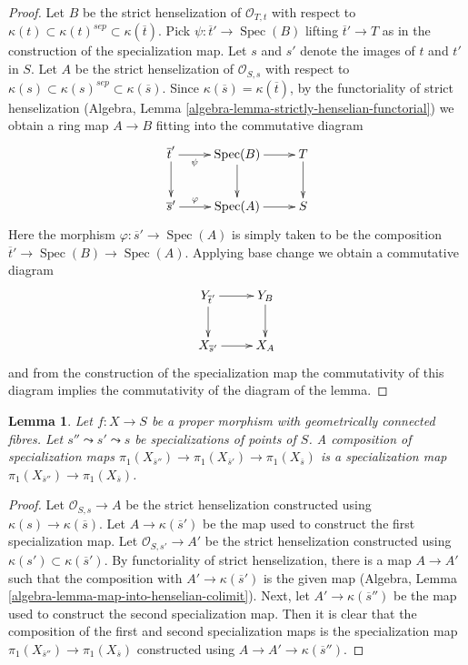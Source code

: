 \documentclass{stacks-project}
\theoremstyle{plain}
\newtheorem{lemma}[subsection]{Lemma}
\theoremstyle{definition}
\theoremstyle{remark}
\numberwithin{equation}{subsection}
\def\Spec{\mathop{\mathrm{Spec}}}
\begin{document}
\begin{proof}
Let $B$ be the strict henselization of $\mathcal{O}_{T, t}$ with respect to
$\kappa(t) \subset \kappa(t)^{sep} \subset \kappa(\overline{t})$.
Pick $\psi : \overline{t}' \to \Spec(B)$ lifting $\overline{t}' \to T$
as in the construction of the specialization map.
Let $s$ and $s'$ denote the images of $t$ and $t'$ in $S$.
Let $A$ be the strict henselization of $\mathcal{O}_{S, s}$
with respect to
$\kappa(s) \subset \kappa(s)^{sep} \subset \kappa(\overline{s})$.
Since $\kappa(\overline{s}) = \kappa(\overline{t})$,
by the functoriality of strict henselization
(Algebra, Lemma \ref{algebra-lemma-strictly-henselian-functorial})
we obtain a ring map $A \to B$ fitting into the commutative diagram
$$
\xymatrix{
\overline{t}' \ar[r]_-\psi \ar[d] & \Spec(B) \ar[d] \ar[r] & T \ar[d] \\
\overline{s}' \ar[r]^-\varphi & \Spec(A) \ar[r] & S
}
$$
Here the morphism $\varphi : \overline{s}' \to \Spec(A)$ is simply taken
to be the composition $\overline{t}' \to \Spec(B) \to \Spec(A)$.
Applying base change we obtain a commutative diagram
$$
\xymatrix{
Y_{\overline{t}'} \ar[r] \ar[d] & Y_B \ar[d] \\
X_{\overline{s}'} \ar[r] & X_A
}
$$
and from the construction of the specialization map the commutativity
of this diagram implies the commutativity of the diagram of the lemma.
\end{proof}

\begin{lemma}
\label{lemma-specialization-map-composition}
Let $f : X \to S$ be a proper morphism with geometrically connected fibres.
Let $s'' \leadsto s' \leadsto s$ be specializations of points of $S$.
A composition of specialization maps
$\pi_1(X_{\overline{s}''}) \to \pi_1(X_{\overline{s}'}) \to
\pi_1(X_{\overline{s}})$ is a specialization map
$\pi_1(X_{\overline{s}''}) \to \pi_1(X_{\overline{s}})$.
\end{lemma}

\begin{proof}
Let $\mathcal{O}_{S, s} \to A$ be the strict henselization
constructed using $\kappa(s) \to \kappa(\overline{s})$.
Let $A \to \kappa(\overline{s}')$ be the map used to construct
the first specialization map. Let $\mathcal{O}_{S, s'} \to A'$
be the strict henselization constructed using
$\kappa(s') \subset \kappa(\overline{s}')$.
By functoriality of strict henselization, there is a map
$A \to A'$ such that the composition with $A' \to \kappa(\overline{s}')$
is the given map
(Algebra, Lemma \ref{algebra-lemma-map-into-henselian-colimit}).
Next, let $A' \to \kappa(\overline{s}'')$ be the map used to
construct the second specialization map. Then it is clear that
the composition of the first and second specialization maps
is the specialization map
$\pi_1(X_{\overline{s}''}) \to \pi_1(X_{\overline{s}})$
constructed using $A \to A' \to \kappa(\overline{s}'')$.
\end{proof}
\end{document}
